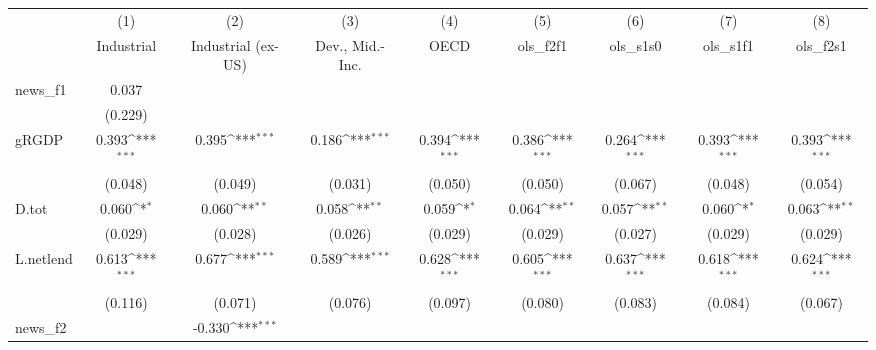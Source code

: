{
\def\sym#1{\ifmmode^{#1}\else\(^{#1}\)\fi}
\begin{tabular}{l*{8}{c}}
\toprule
            &\multicolumn{1}{c}{(1)}&\multicolumn{1}{c}{(2)}&\multicolumn{1}{c}{(3)}&\multicolumn{1}{c}{(4)}&\multicolumn{1}{c}{(5)}&\multicolumn{1}{c}{(6)}&\multicolumn{1}{c}{(7)}&\multicolumn{1}{c}{(8)}\\
            &\multicolumn{1}{c}{Industrial}&\multicolumn{1}{c}{Industrial (ex-US)}&\multicolumn{1}{c}{Dev., Mid.-Inc.}&\multicolumn{1}{c}{OECD}&\multicolumn{1}{c}{ols\_f2f1}&\multicolumn{1}{c}{ols\_s1s0}&\multicolumn{1}{c}{ols\_s1f1}&\multicolumn{1}{c}{ols\_f2s1}\\
\midrule
news\_f1     &       0.037         &                     &                     &                     &                     &                     &                     &                     \\
            &     (0.229)         &                     &                     &                     &                     &                     &                     &                     \\
\addlinespace
gRGDP       &       0.393\sym{***}&       0.395\sym{***}&       0.186\sym{***}&       0.394\sym{***}&       0.386\sym{***}&       0.264\sym{***}&       0.393\sym{***}&       0.393\sym{***}\\
            &     (0.048)         &     (0.049)         &     (0.031)         &     (0.050)         &     (0.050)         &     (0.067)         &     (0.048)         &     (0.054)         \\
\addlinespace
D.tot       &       0.060\sym{*}  &       0.060\sym{**} &       0.058\sym{**} &       0.059\sym{*}  &       0.064\sym{**} &       0.057\sym{**} &       0.060\sym{*}  &       0.063\sym{**} \\
            &     (0.029)         &     (0.028)         &     (0.026)         &     (0.029)         &     (0.029)         &     (0.027)         &     (0.029)         &     (0.029)         \\
\addlinespace
L.netlend   &       0.613\sym{***}&       0.677\sym{***}&       0.589\sym{***}&       0.628\sym{***}&       0.605\sym{***}&       0.637\sym{***}&       0.618\sym{***}&       0.624\sym{***}\\
            &     (0.116)         &     (0.071)         &     (0.076)         &     (0.097)         &     (0.080)         &     (0.083)         &     (0.084)         &     (0.067)         \\
\addlinespace
news\_f2     &                     &      -0.330\sym{***}&                     &                     &                     &                     &                     &                     \\

\end{tabular}}

